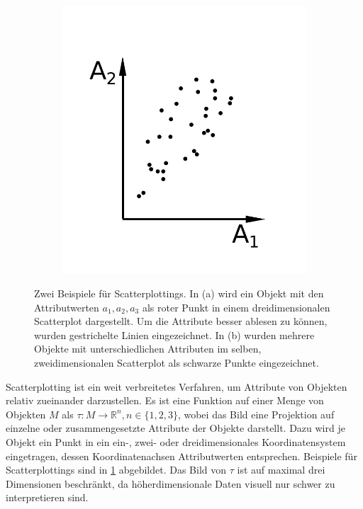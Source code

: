 \documentclass[a4paper,fontsize=12pt,toc=bib,halfparskip,ngerman]{scrartcl}
\begin{document}
\begin{figure}
\begin{subfigure}{0.30\textwidth}
		\includegraphics[width=\textwidth]{pictures/Scatterplot2D}
		\caption{}
	\end{subfigure}
	\hspace{2cm}
	\caption{Zwei Beispiele f\"ur Scatterplottings. In (a) wird ein Objekt mit den Attributwerten $a_1, a_2, a_3$ als roter Punkt in einem dreidimensionalen Scatterplot dargestellt. Um die Attribute besser ablesen zu k\"onnen, wurden gestrichelte Linien eingezeichnet. In (b) wurden mehrere Objekte mit unterschiedlichen Attributen im selben, zweidimensionalen Scatterplot als schwarze Punkte eingezeichnet.}
	\label{Scatterplots}
\end{figure}

Scatterplotting ist ein weit verbreitetes Verfahren, um Attribute von Objekten relativ zueinander darzustellen. Es ist eine Funktion auf einer Menge von Objekten $M$ als $\tau: M \rightarrow \mathbb{R}^n,n\in\{1,2,3\}$, wobei das Bild eine Projektion auf einzelne oder zusammengesetzte Attribute der Objekte darstellt.  Dazu wird je Objekt ein Punkt in ein ein-, zwei- oder dreidimensionales Koordinatensystem eingetragen, dessen Koordinatenachsen Attributwerten entsprechen. Beispiele f\"ur Scatterplottings sind in \cref{Scatterplots} abgebildet. Das Bild von $\tau$ ist auf maximal drei Dimensionen beschr\"ankt, da h\"oherdimensionale Daten visuell nur schwer zu interpretieren sind.
\end{document}
